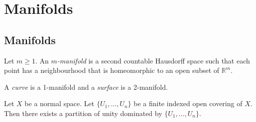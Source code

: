 \chapter{Manifolds}

\section{Manifolds}

 \begin{df}[Manifold]
  Let $m \geq 1$. An \emph{$m$-manifold} is a second countable Hausdorff space
such that each point has a neighbourhood that is homeomorphic to an open subset
of $\mathbb{R}^m$.

A \emph{curve} is a 1-manifold and a \emph{surface} is a 2-manifold.
\end{df}

 \begin{thm}
   \label{thm:topology:manifolds:partition}
  Let $X$ be a normal space.
  Let $\{ U_1, \ldots, U_n \}$ be a finite indexed open covering of $X$. Then
  there exists a partition of unity dominated by $\{ U_1, \ldots, U_n \}$.
\end{thm}

